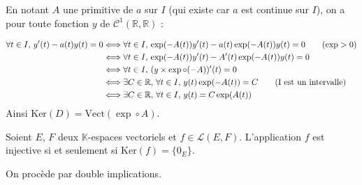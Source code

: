 \documentclass[french,11pt,twoside]{VcCours}
\begin{document}
\medskip 

En notant $A$ une primitive de $a$ sur $I$ (qui existe car $a$ est continue sur $I$), on a pour toute fonction $y$ de $\mathcal{C}^1(\mathbb{R}, \mathbb{R})$ : 

\begin{align*}
\forall t \in I, \, y'(t)-a(t)y(t) =0& \Longleftrightarrow  \forall t \in I, \, \exp(-A(t))y'(t)- a(t)\exp(-A(t))y(t) = 0  \qquad (\exp >0)\\
 & \Longleftrightarrow  \forall t \in I, \, \exp(-A(t))y'(t)- A'(t)\exp(-A(t))y(t) = 0 \\
 & \Longleftrightarrow  \forall t \in I, \, (y \times \exp \circ (-A))'(t) = 0 \\
 & \Longleftrightarrow  \exists C \in \mathbb{R}, \,  \forall t \in I, \, y(t)  \exp (-A(t)) = C \qquad \hbox{(I est un intervalle)}\\
 & \Longleftrightarrow  \exists C \in \mathbb{R}, \,  \forall t \in I, \, y(t) = C \exp (A(t)) \\
\end{align*}
Ainsi $\textrm{Ker}(D) = \textrm{Vect}(\exp \circ A)$.

\begin{Proposition}{} Soient $E$, $F$ deux $\mathbb{K}$-espaces vectoriels et $f \in \mathcal{L}(E,F)$. L'application $f$ est injective si et seulement si $\textrm{Ker}(f) = \lbrace 0_E \rbrace$.
\end{Proposition}

\begin{Demonstration}{} On procède par double implications.
%
%
%
%

\vspace{6cm}
\end{Demonstration}
\end{document}
